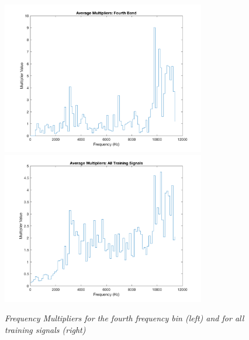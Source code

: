 \documentclass[twoside,a4paper]{article}
\begin{document}
\begin{figure}[ht]
  \includegraphics[width=3.5in]{Pictures/FreqMult4.png}
  \includegraphics[width=3.5in]{Pictures/FreqMultAll.png}
  \caption{\label{freq3} {\it Frequency Multipliers for the fourth frequency bin (left) and for all training signals (right)}}
  \centering
  \end{figure}
\end{document}
